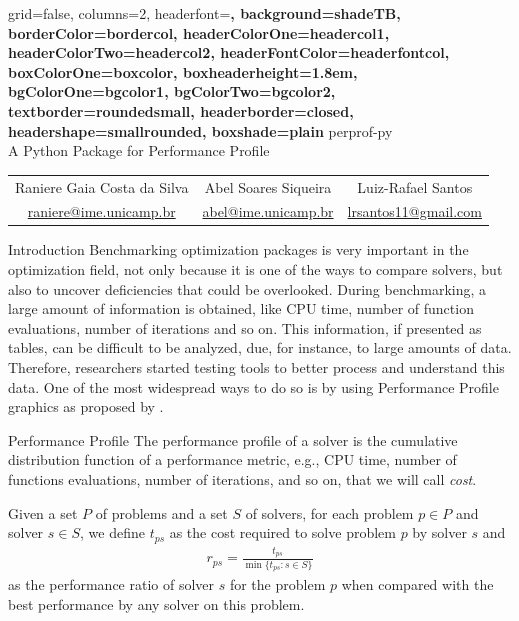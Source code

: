\documentclass[a0paper,portrait]{baposter}
\begin{document}
\begin{poster}
  {
    grid=false,
    columns=2,
    headerfont=\Large\sf\bf,
    background=shadeTB,
    borderColor=bordercol,
    headerColorOne=headercol1,
    headerColorTwo=headercol2,
    headerFontColor=headerfontcol,
    boxColorOne=boxcolor,
    boxheaderheight=1.8em,
    bgColorOne=bgcolor1,
    bgColorTwo=bgcolor2,
    textborder=roundedsmall,
    headerborder=closed,
    headershape=smallrounded,
    boxshade=plain
  }
  {
    \unicamplogol
  }
  {
    perprof-py \vspace{2pt} \\ A Python Package for Performance Profile
  }
  {
    \begin{tabular}{ccc}
      Raniere Gaia Costa da Silva &
      Abel Soares Siqueira &
      Luiz-Rafael Santos \\
      \url{raniere@ime.unicamp.br} &
      \url{abel@ime.unicamp.br} &
      \url{lrsantos11@gmail.com}
    \end{tabular}
  }
  {
    \imecclogo
  }

  \linespread{1.1}

  \begin{posterbox}[column=0]{Introduction}
    Benchmarking optimization packages is very important in the optimization
    field, not only because it is one of the ways to compare solvers, but also
    to uncover deficiencies that could be overlooked. During benchmarking,
    a large amount of information is obtained, like CPU time, number of function
    evaluations, number of iterations and so on. This information, if
    presented as tables, can be difficult to be analyzed, due, for instance,
    to large amounts of data. Therefore, researchers started testing tools to
    better process and understand this data.  One of the most widespread ways
    to do so is by using Performance Profile graphics as proposed by
    \textcite{Dolan2002}.
  \end{posterbox}

  \begin{posterbox}[column=0,below=auto]{Performance Profile}
    The performance profile of a solver is the cumulative distribution
    function of a performance metric, e.g., CPU time, number of functions
    evaluations, number of iterations, and so on, that we will call \emph{cost}.

    Given a set $P$ of problems and a set $S$ of solvers, for each problem $p
    \in P$ and solver $s \in S$, we define $t_{ps}$ as the cost
    required to solve problem $p$ by solver $s$ and
    \begin{align*}
      r_{ps} = \frac{t_{ps}}{\min\{t_{ps}: s \in S\}}
    \end{align*}
    as the performance ratio of solver $s$ for the problem $p$ when compared
    with the best performance by any solver on this problem.


\end{posterbox}
\end{poster}
\end{document}
